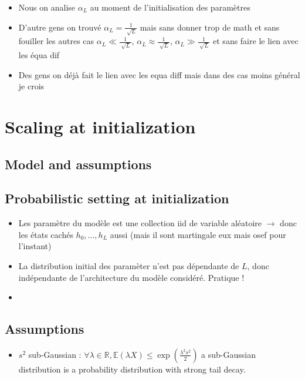 \documentclass{article}
\theoremstyle{plain}%
\theoremstyle{definition}
\theoremstyle{remark}
\begin{document}
\begin{itemize}
\begin{itemize}
        \item Nous on analise $ \alpha _L$ au moment de l'initialisation des paramètres 
        \item D'autre gens on trouvé $ \alpha _L = \frac{1}{\sqrt[]{L}} $ mais sans donner trop de math et sans fouiller les autres cas $ \alpha _L \ll \frac{1}{\sqrt[]{L}} $, $ \alpha _L \approx \frac{1}{\sqrt[]{L}} $, $ \alpha _L \gg \frac{1}{\sqrt[]{L}} $ et sans faire le lien avec les équa dif
        \item Des gens on déjà fait le lien avec les equa diff mais dans des cas moins général je crois
    \end{itemize}
\end{itemize}

\section{Scaling at initialization}
\subsection{Model and assumptions}
\subsection{Probabilistic setting at initialization }
\begin{itemize}
    \item Les paramètre du modèle est une collection iid de variable aléatoire $\rightarrow$ donc les états cachés $ h_0, \dots, h_L $ aussi (mais il sont martingale eux mais osef pour l'instant)
    \item La distribution initial des paramèter n'est pas dépendante de $ L $, donc indépendante de l'architecture du modèle considéré. Pratique !
    \item 
\end{itemize}

\subsection{Assumptions}
\begin{itemize}
    \item $ s^2 $ sub-Gaussian : $ \forall \lambda \in \mathbb{R}, \mathbb{E}(\lambda X) \leq  \exp (\frac{\lambda ^2 s^2 }{2})$  a sub-Gaussian distribution is a probability distribution with strong tail decay.
\end{itemize}
\end{document}
